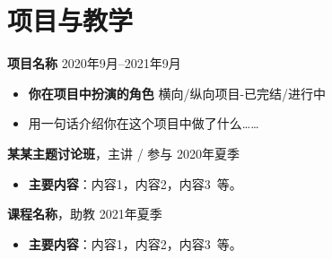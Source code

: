 \documentclass[11pt]{article}
\newlength{\iconwidth}
\begin{document}
    \begin{minipage}[t]{\textwidth}
    \section[项目与教学]{\makebox[\iconwidth][c]{\color{primary_color}{\faChalkboardTeacher}}\quad 项目与教学}

    {\large \textbf{项目名称}} \hfill 2020年9月--2021年9月
    \begin{itemize}
        \item \textbf{你在项目中扮演的角色} \hfill 横向/纵向项目-已完结/进行中
        \item 用一句话介绍你在这个项目中做了什么\dots\dots
    \end{itemize}

    \vspace{0.5em}
    {\large \textbf{某某主题讨论班}}，主讲 / 参与 \hfill 2020年夏季
    \begin{itemize}
        \item \textbf{主要内容}：内容1，内容2，内容3\ 等。
    \end{itemize}

    \vspace{0.5em}
    {\large \textbf{课程名称}}，助教 \hfill 2021年夏季
    \begin{itemize}
        \item \textbf{主要内容}：内容1，内容2，内容3\ 等。
    \end{itemize}

    \vspace{1.2em}
    \end{minipage}
\end{document}
